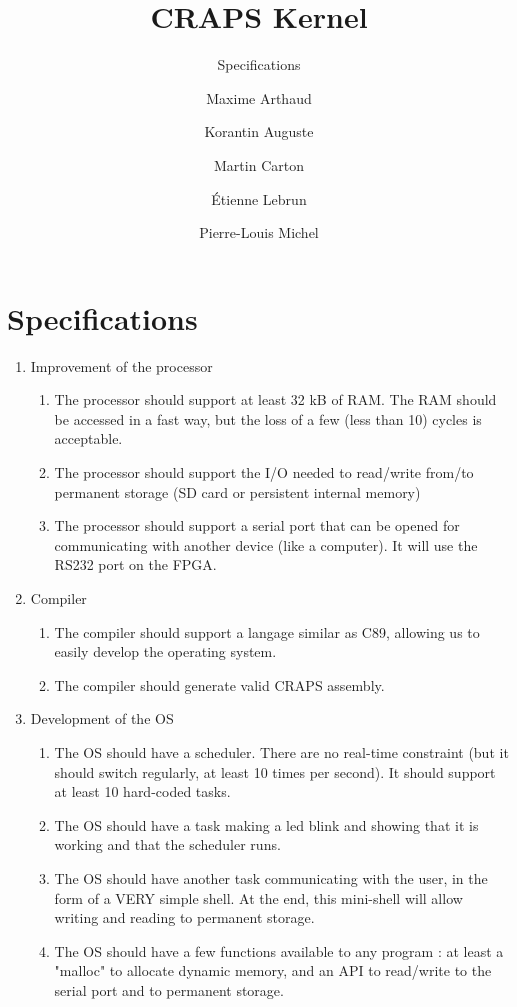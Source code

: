 \documentclass{article}
\title{CRAPS Kernel}
\subtitle{Specifications}
\author{
       Maxime Arthaud
  \and Korantin Auguste
  \and Martin Carton
  \and Étienne Lebrun
  \and Pierre-Louis Michel
}
\begin{document}
  
  \newpage

  \section{Specifications}

    \begin{enumerate}
    \item Improvement of the processor
        \begin{enumerate}
        \item The processor should support at least 32 kB of RAM. The RAM should be accessed in a fast way, but the loss of a few (less than 10) cycles is acceptable.
        \item The processor should support the I/O needed to read/write from/to permanent storage (SD card or persistent internal memory)
        \item The processor should support a serial port that can be opened for communicating with another device (like a computer). It will use the RS232 port on the FPGA.
        \end{enumerate}
    \item Compiler
        \begin{enumerate}
        \item The compiler should support a langage similar as C89, allowing us to easily develop the operating system.
        \item The compiler should generate valid CRAPS assembly.
        \end{enumerate}
    \item Development of the OS
        \begin{enumerate}
        \item The OS should have a scheduler. There are no real-time constraint (but it should switch regularly, at least 10 times per second). It should support at least 10 hard-coded tasks.
        \item The OS should have a task making a led blink and showing that it is working and that the scheduler runs.
        \item The OS should have another task communicating with the user, in the form of a VERY simple shell. At the end, this mini-shell will allow writing and reading to permanent storage.
        \item The OS should have a few functions available to any program : at least a "malloc" to allocate dynamic memory, and an API to read/write to the serial port and to permanent storage.
        \end{enumerate}
    \end{enumerate}
\end{document}
